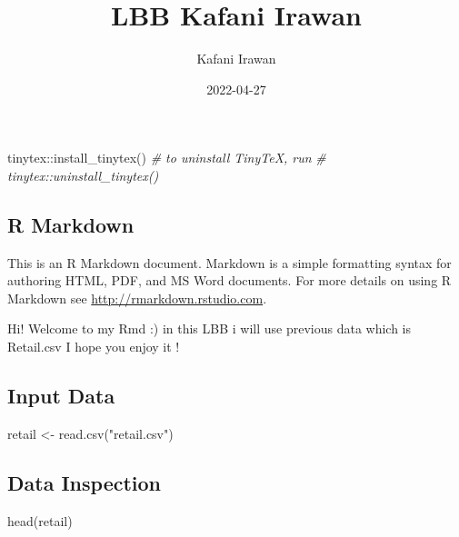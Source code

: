 \documentclass[
]{article}
\title{LBB Kafani Irawan}
\author{Kafani Irawan}
\date{2022-04-27}
\newenvironment{Shaded}{\begin{snugshade}}{\end{snugshade}}
\newcommand{\CommentTok}[1]{\textcolor[rgb]{0.56,0.35,0.01}{\textit{#1}}}
\newcommand{\FunctionTok}[1]{\textcolor[rgb]{0.00,0.00,0.00}{#1}}
\newcommand{\NormalTok}[1]{#1}
\newcommand{\OtherTok}[1]{\textcolor[rgb]{0.56,0.35,0.01}{#1}}
\newcommand{\SpecialCharTok}[1]{\textcolor[rgb]{0.00,0.00,0.00}{#1}}
\newcommand{\StringTok}[1]{\textcolor[rgb]{0.31,0.60,0.02}{#1}}
\begin{document}
\maketitle

{
\setcounter{tocdepth}{2}
\tableofcontents
}
\begin{Shaded}
\begin{Highlighting}[]
\NormalTok{tinytex}\SpecialCharTok{::}\FunctionTok{install\_tinytex}\NormalTok{()}
\CommentTok{\# to uninstall TinyTeX, run}
\CommentTok{\# tinytex::uninstall\_tinytex()}
\end{Highlighting}
\end{Shaded}

\hypertarget{r-markdown}{%
\subsection{R Markdown}\label{r-markdown}}

This is an R Markdown document. Markdown is a simple formatting syntax
for authoring HTML, PDF, and MS Word documents. For more details on
using R Markdown see \url{http://rmarkdown.rstudio.com}.

Hi! Welcome to my Rmd :) in this LBB i will use previous data which is
Retail.csv I hope you enjoy it !

\hypertarget{input-data}{%
\subsection{Input Data}\label{input-data}}

\begin{Shaded}
\begin{Highlighting}[]
\NormalTok{retail }\OtherTok{\textless{}{-}} \FunctionTok{read.csv}\NormalTok{(}\StringTok{"retail.csv"}\NormalTok{)}
\end{Highlighting}
\end{Shaded}

\hypertarget{data-inspection}{%
\subsection{Data Inspection}\label{data-inspection}}

\begin{Shaded}
\begin{Highlighting}[]
\FunctionTok{head}\NormalTok{(retail)}
\end{Highlighting}
\end{Shaded}
\end{document}
